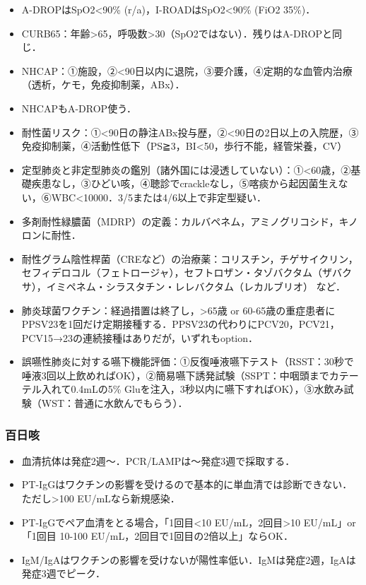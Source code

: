 \begin{itemize}

\item A-DROPはSpO2<90\% (r/a)，I-ROADはSpO2<90\% (FiO2 35\%)．
\item CURB65：年齢>65，呼吸数>30（SpO2ではない）．残りはA-DROPと同じ．
\item NHCAP：①施設，②<90日以内に退院，③要介護，④定期的な血管内治療（透析，ケモ，免疫抑制薬，ABx）．
\item NHCAPもA-DROP使う．
\item 耐性菌リスク：①<90日の静注ABx投与歴，②<90日の2日以上の入院歴，③免疫抑制薬，④活動性低下（PS≧3，BI<50，歩行不能，経管栄養，CV）


\item 定型肺炎と非定型肺炎の鑑別（諸外国には浸透していない）：①<60歳，②基礎疾患なし，③ひどい咳，④聴診でcrackleなし，⑤喀痰から起因菌生えない，⑥WBC<10000．3/5または4/6以上で非定型疑い．
\item 多剤耐性緑膿菌（MDRP）の定義：カルバペネム，アミノグリコシド，キノロンに耐性．
\item 耐性グラム陰性桿菌（CREなど）の治療薬：コリスチン，チゲサイクリン，セフィデロコル（フェトロージャ\circledR），セフトロザン・タゾバクタム（ザバクサ\circledR），イミペネム・シラスタチン・レレバクタム（レカルブリオ\circledR）
など．

\item 肺炎球菌ワクチン：経過措置は終了し，>65歳 or 60-65歳の重症患者にPPSV23を1回だけ定期接種する．PPSV23の代わりにPCV20，PCV21，PCV15→23の連続接種はありだが，いずれもoption．




\item 誤嚥性肺炎に対する嚥下機能評価：①反復唾液嚥下テスト（RSST：30秒で唾液3回以上飲めればOK），②簡易嚥下誘発試験（SSPT：中咽頭までカテーテル入れて0.4mLの5\% Gluを注入，3秒以内に嚥下すればOK），③水飲み試験（WST：普通に水飲んでもらう）．
\end{itemize}

\subsubsection{百日咳}
\begin{itemize}
\item 血清抗体は発症2週〜．PCR/LAMPは〜発症3週で採取する．
\item PT-IgGはワクチンの影響を受けるので基本的に単血清では診断できない．ただし>100 EU/mLなら新規感染．
\item PT-IgGでペア血清をとる場合，「1回目<10 EU/mL，2回目>10 EU/mL」or「1回目 10-100 EU/mL，2回目で1回目の2倍以上」ならOK．
\item IgM/IgAはワクチンの影響を受けないが陽性率低い．IgMは発症2週，IgAは発症3週でピーク．

\end{itemize}

